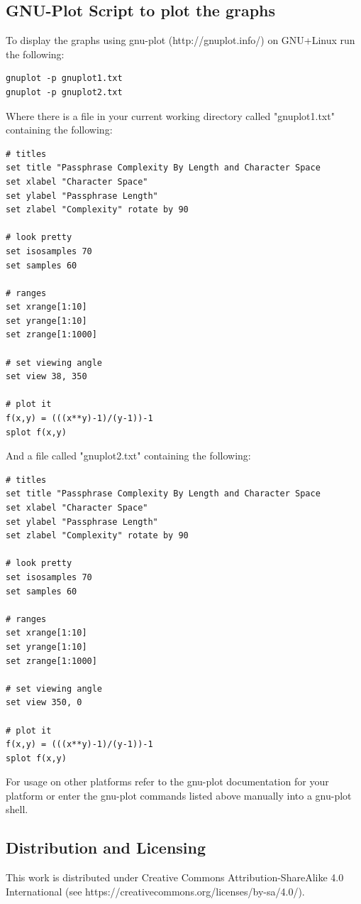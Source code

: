 \documentclass[11pt,a4paper]{article}
\begin{document}
\subsection{GNU-Plot Script to plot the graphs}
To display the graphs using gnu-plot (http://gnuplot.info/) on GNU+Linux run the following:
\begin{lstlisting}
gnuplot -p gnuplot1.txt
gnuplot -p gnuplot2.txt
\end{lstlisting}
Where there is a file in your current working directory called "gnuplot1.txt" containing the following:
\begin{lstlisting}
# titles
set title "Passphrase Complexity By Length and Character Space
set xlabel "Character Space"
set ylabel "Passphrase Length"
set zlabel "Complexity" rotate by 90

# look pretty
set isosamples 70
set samples 60

# ranges
set xrange[1:10]
set yrange[1:10]
set zrange[1:1000]

# set viewing angle
set view 38, 350

# plot it
f(x,y) = (((x**y)-1)/(y-1))-1
splot f(x,y)
\end{lstlisting}
And a file called "gnuplot2.txt" containing the following:
\begin{lstlisting}
# titles
set title "Passphrase Complexity By Length and Character Space
set xlabel "Character Space"
set ylabel "Passphrase Length"
set zlabel "Complexity" rotate by 90

# look pretty
set isosamples 70
set samples 60

# ranges
set xrange[1:10]
set yrange[1:10]
set zrange[1:1000]

# set viewing angle
set view 350, 0

# plot it
f(x,y) = (((x**y)-1)/(y-1))-1
splot f(x,y)
\end{lstlisting}

For usage on other platforms refer to the gnu-plot documentation for your platform or enter the gnu-plot commands listed above manually into a gnu-plot shell.

\subsection{Distribution and Licensing}
This work is distributed under  Creative Commons Attribution-ShareAlike 4.0 International (see https://creativecommons.org/licenses/by-sa/4.0/).
\end{document}

